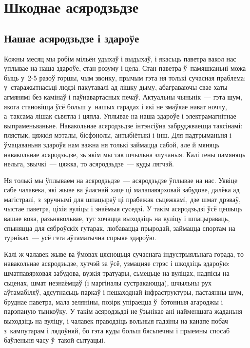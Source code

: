 \chapter{Шкоднае асяродзьдзе}

\section{Нашае асяродзьдзе і здароўе}

Кожны месяц мы робім мільён удыхаў і выдыхаў, і якасьць паветра вакол нас уплывае на наша здароўе, стан розуму і цела. Стан паветра ў~памяшканьні можа быць у~2-5 разоў горшы, чым звонку, прычым гэта ня толькі сучасная праблема: у~старажытнасьці людзі пакутавалі ад лішку дыму, абаграваючы свае хаты агмянямі без камінаў і паўнавартасных печаў. Актуальны чыньнік~--- гэта шум, якога становіцца ўсё больш у~нашых гарадах і які не змаўкае нават ноччу, а~таксама лішак сьвятла і цяпла. Уплывае на наша здароўе і электрамагнітнае выпраменьваньне. Навакольнае асяродзьдзе інтэнсіўна забруджваецца таксінамі: плястык, цяжкія мэталы, бісфэнолы, антыбіётыкі і інш. Для падтрыманьня і ўмацаваньня здароўя нам важна ня толькі займацца сабой, але й мяняць навакольнае асяродзьдзе, зь якім мы так шчыльна злучаныя. Калі гены памяняць нельга, звычкі~--- цяжка, то асяродзьдзе~--- куды лягчэй.

Ня толькі мы ўплываем на асяродзьдзе~--- асяродзьдзе ўплывае на нас. Уявіце сабе чалавека, які жыве ва ўласнай хаце ці малапавярховай забудове, далёка ад магістралі, з~зручнымі для шпацыраў ці прабежак сьцежкамі, дзе шмат дрэваў, чыстае паветра, ціхія вуліцы і знаёмыя суседзі. У такім асяродзьдзі ўсё цешыць вашае вока, разьнявольвае, тут хочацца выходзіць на вуліцу і шпацыраваць, спыняцца для сяброўскіх гутарак, любавацца прыродай, займацца спортам на турніках~--- усё гэта аўтаматычна спрыяе здароўю.

Калі ж чалавек жыве ва ўмовах цясноцьця сучаснага індустрыяльнага горада, то навакольнае асяродзьдзе, хутчэй за ўсё, узмацняе стрэс і шкодзіць здароўю: шматпавярховая забудова, вузкія тратуары, сьмецьце на вуліцах, надпісы на сьценах, шмат незнаёмцаў (і маргіналы сустракаюцца), шчыльны рух аўтамабіляў, адсутнасьць паркаў і пешаходнай інфраструктуры, пастаянны шум, бруднае паветра, мала зеляніны, позірк упіраецца ў~бэтонныя агароджы і парэпаную тынкоўку. У такім асяродзьдзі не ўзьнікае ані найменшага жаданьня выходзіць на вуліцу, і чалавек праводзіць вольныя гадзіны на канапе побач з~кампутарам і лядоўняй, бо гэта куды больш бясьпечны і прыемны спосаб баўленьня часу ў~такой сытуацыі.

